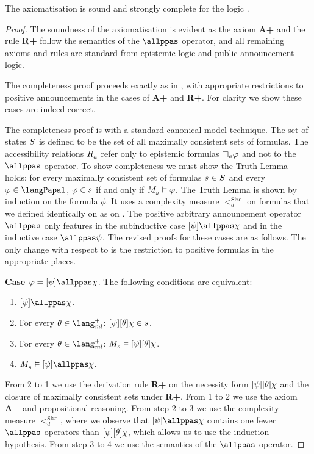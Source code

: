 \begin{theorem}
The axiomatisation \axiomPapalS{} is sound and strongly complete for the logic \logicPapalS{}.
\end{theorem}

\begin{proof}
The soundness of the axiomatisation is evident as the axiom {\bf A+} and the rule {\bf R+} follow the semantics of the $\allppas$ operator, and all remaining axioms and rules are standard from epistemic logic and public announcement logic.

The completeness proof proceeds exactly as in \cite{balbianietal.short:2014}, with appropriate restrictions to positive announcements in the cases of {\bf A+} and {\bf R+}.
For clarity we show these cases are indeed correct.

The completeness proof is with a standard canonical model technique.
The set of states $\kStates$ is defined to be the set of all maximally consistent sets of \langPapal{} formulas.
The accessibility relations $\kAccessibility{\agentA}$ refer only to epistemic formulas $\knowsA \phi$ and not to the $\allppas$ operator.
To show completeness we must show the Truth Lemma holds: for every maximally consistent set of formulas $\kStateS \in \kStates$ and every $\phi \in \langPapal$, $\phi \in \kStateS$ if and only if $\kPModel{\kStateS} \entails \phi$.
The Truth Lemma is shown by induction on the formula $\phi$.
It uses a complexity measure $<^\text{Size}_d$ on formulas that we defined identically on \langPapal{} as on \langApal{}.
The positive arbitrary announcement operator $\allppas$ only features in the subinductive case $\announceA{\psi} \allppas \chi$ and in the inductive case $\allppas \psi$.
The revised proofs for these cases are as follows.
The only change with respect to \cite{balbianietal.short:2014} is the restriction to positive formulas in the appropriate places.

{\bf Case $\phi = \announceA{\psi} \allppas \chi$}.
The following conditions are equivalent:
\begin{enumerate}
    \item $\announceA{\psi} \allppas \chi$.
    \item For every $\theta \in \langMlPlus$: $\announceA{\psi} \announceA{\theta} \chi \in \kStateS$.
    \item For every $\theta \in \langMlPlus$: $\kPModel{\kStateS} \entails \announceA{\psi} \announceA{\theta} \chi$.
    \item $\kPModel{\kStateS} \entails \announceA{\psi} \allppas \chi$.
\end{enumerate}
From 2 to 1 we use the derivation rule {\bf R+} on the necessity form $[ \psi ] [ \theta ] \chi$ and the closure of maximally consistent sets under {\bf R+}. 
From 1 to 2 we use the axiom {\bf A+} and propositional reasoning. 
From step 2 to 3 we use the complexity measure $<^\text{Size}_d$, where we observe that $\announceA{\psi} \allppas \chi$ contains one fewer $\allppas$ operators than $[ \psi ] [ \theta ] \chi$, which allows us to use the induction hypothesis. 
From step 3 to 4 we use the semantics of the $\allppas$ operator.


\end{proof}
